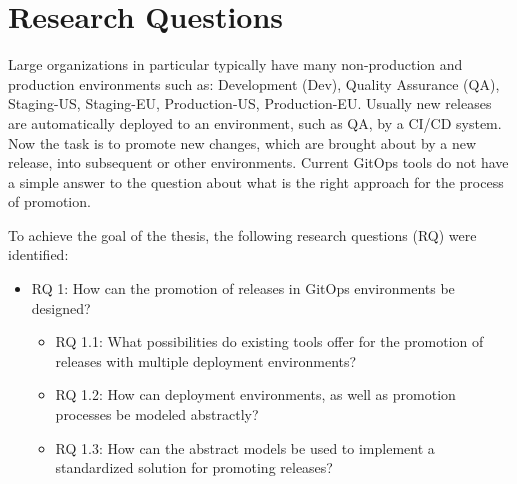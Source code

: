 \section{Research Questions}
\label{introduction:research-question}


%
Large organizations in particular typically have many
non-production and production environments
such as:
Development (Dev),
Quality Assurance (QA),
Staging-US,
Staging-EU,
Production-US,
Production-EU.
Usually new releases are automatically deployed to an environment,
such as QA, 
by a CI/CD system.
Now the task is to promote
new changes, which are brought about by a new release,
into subsequent or other environments.
Current GitOps tools do not have a simple answer to
the question about what is the right approach for the process of promotion.
\bigskip


\noindent
To achieve the goal of the thesis, the following research questions (RQ) were identified:

\begin{itemize}
	\item RQ 1: How can the promotion of releases in GitOps environments be designed?
	\begin{itemize}
		\item RQ 1.1: What possibilities do existing tools offer for the promotion of releases with multiple deployment environments?
		\item RQ 1.2: How can deployment environments, as well as promotion processes be modeled abstractly?
		\item RQ 1.3: How can the abstract models be used to implement a standardized solution for promoting releases?
	\end{itemize}
\end{itemize}







